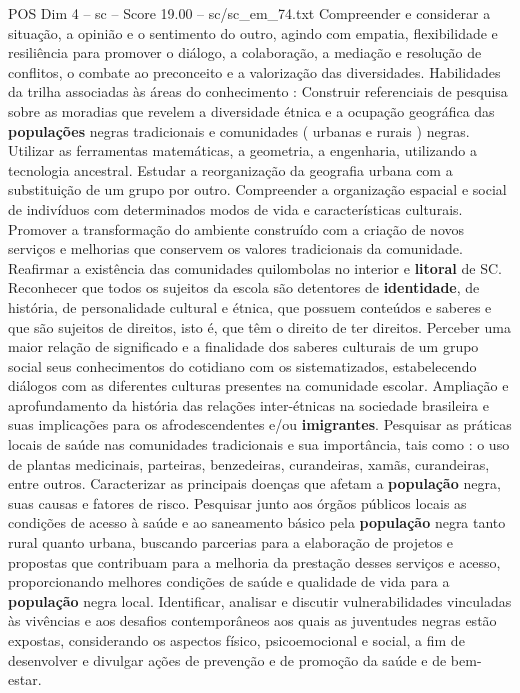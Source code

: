 \begin{textsample}{POS Dim 4 – sc – Score 19.00 – sc/sc\_em\_74.txt}
Compreender e considerar a situação, a opinião e o sentimento do outro, agindo com empatia, flexibilidade e resiliência para promover o diálogo, a colaboração, a mediação e resolução de conflitos, o combate ao preconceito e a valorização das diversidades.
Habilidades da trilha associadas às áreas do conhecimento : Construir referenciais de pesquisa sobre as moradias que revelem a diversidade étnica e a ocupação geográfica das \textbf{populações} negras tradicionais e comunidades ( urbanas e rurais ) negras.
Utilizar as ferramentas matemáticas, a geometria, a engenharia, utilizando a tecnologia ancestral.
Estudar a reorganização da geografia urbana com a substituição de um grupo por outro.
Compreender a organização espacial e social de indivíduos com determinados modos de vida e características culturais.
Promover a transformação do ambiente construído com a criação de novos serviços e melhorias que conservem os valores tradicionais da comunidade.
Reafirmar a existência das comunidades quilombolas no interior e \textbf{litoral} de SC.
Reconhecer que todos os sujeitos da escola são detentores de \textbf{identidade}, de história, de personalidade cultural e étnica, que possuem conteúdos e saberes e que são sujeitos de direitos, isto é, que têm o direito de ter direitos.
Perceber uma maior relação de significado e a finalidade dos saberes culturais de um grupo social seus conhecimentos do cotidiano com os sistematizados, estabelecendo diálogos com as diferentes culturas presentes na comunidade escolar.
Ampliação e aprofundamento da história das relações inter-étnicas na sociedade brasileira e suas implicações para os afrodescendentes e/ou \textbf{imigrantes}.
Pesquisar as práticas locais de saúde nas comunidades tradicionais e sua importância, tais como : o uso de plantas medicinais, parteiras, benzedeiras, curandeiras, xamãs, curandeiras, entre outros.
Caracterizar as principais doenças que afetam a \textbf{população} negra, suas causas e fatores de risco.
Pesquisar junto aos órgãos públicos locais as condições de acesso à saúde e ao saneamento básico pela \textbf{população} negra tanto rural quanto urbana, buscando parcerias para a elaboração de projetos e propostas que contribuam para a melhoria da prestação desses serviços e acesso, proporcionando melhores condições de saúde e qualidade de vida para a \textbf{população} negra local.
Identificar, analisar e discutir vulnerabilidades vinculadas às vivências e aos desafios contemporâneos aos quais as juventudes negras estão expostas, considerando os aspectos físico, psicoemocional e social, a fim de desenvolver e divulgar ações de prevenção e de promoção da saúde e de bem-estar.

\end{textsample}
